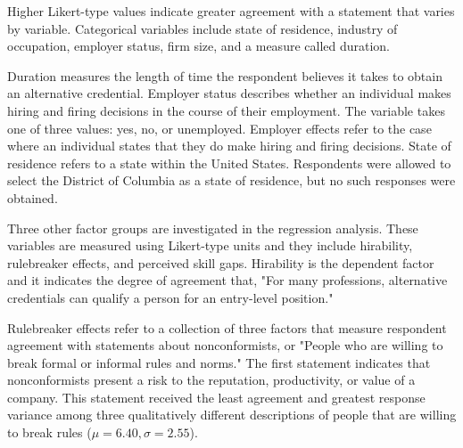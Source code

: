\documentclass[review]{elsarticle}
\begin{document}
Higher Likert-type values indicate greater agreement with a statement that varies by variable.
Categorical variables include state of residence,
industry of occupation,
employer status,
firm size,
and a measure called duration.

Duration measures the length of time the respondent believes it takes to obtain an alternative credential.
Employer status describes whether an individual makes hiring and firing decisions in the course of their employment.
The variable takes one of three values: yes, no, or unemployed.
Employer effects refer to the case where an individual states that they do make hiring and firing decisions.
State of residence refers to a state within the United States.
Respondents were allowed to select the District of Columbia as a state of residence,
but no such responses were obtained.

Three other factor groups are investigated in the regression analysis.
These variables are measured using Likert-type units and they include hirability,
rulebreaker effects,
and perceived skill gaps.
Hirability is the dependent factor and it indicates the degree of agreement that, "For many professions, alternative credentials can qualify a person for an entry-level position."

Rulebreaker effects refer to a collection of three factors that measure respondent agreement with statements about nonconformists, or "People who are willing to break formal or informal rules and norms."
The first statement indicates that nonconformists present a risk to the reputation, productivity, or value of a company.
This statement received the least agreement and greatest response variance among three qualitatively different descriptions of people that are willing to break rules ($\mu = 6.40, \sigma = 2.55$).
\end{document}
